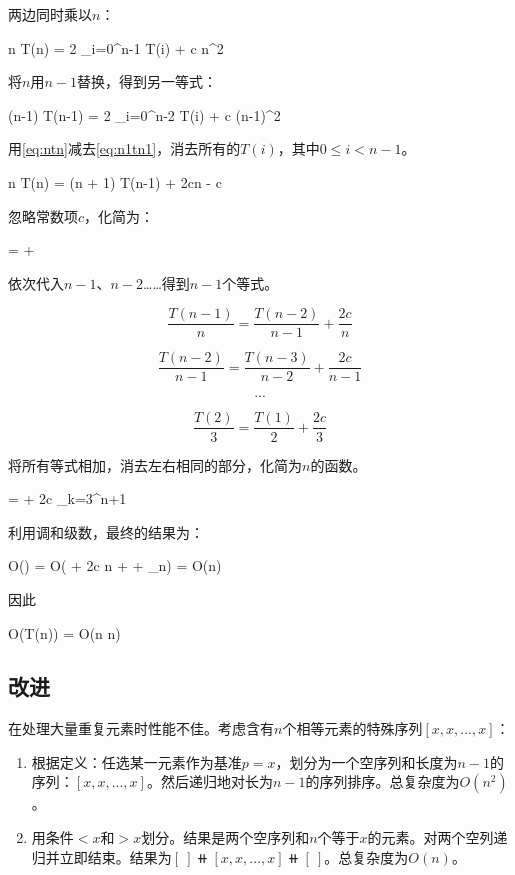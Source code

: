 \documentclass[b5paper]{ctexart}
\begin{document}
两边同时乘以$n$：

\be
n T(n) = 2 \sum_{i=0}^{n-1} T(i) + c n^2
\label{eq:ntn}
\ee

将$n$用$n-1$替换，得到另一等式：

\be
(n-1) T(n-1) = 2 \sum_{i=0}^{n-2} T(i) + c (n-1)^2
\label{eq:n1tn1}
\ee

用\cref{eq:ntn}减去\cref{eq:n1tn1}，消去所有的$T(i)$，其中$0 \leq i < n-1$。

\be
n T(n) = (n + 1) T(n-1) + 2cn - c
\ee

忽略常数项$c$，化简为：

\be
{} =  + 
\ee

依次代入$n-1$、$n-2$……得到$n-1$个等式。

\[
\frac{T(n-1)}{n} = \frac{T(n-2)}{n-1} + \frac{2c}{n}
\]

\[
\frac{T(n-2)}{n-1} = \frac{T(n-3)}{n-2} + \frac{2c}{n-1}
\]

\[
...
\]

\[
\frac{T(2)}{3} = \frac{T(1)}{2} + \frac{2c}{3}
\]

将所有等式相加，消去左右相同的部分，化简为$n$的函数。

\be
{} =  + 2c \sum_{k=3}^{n+1} 
\ee

利用调和级数，最终的结果为：

\be
O() = O( + 2c \ln n + \gamma + \epsilon_n) = O(\lg n)
\ee

因此

\be
O(T(n)) = O(n \lg n)
\ee

\subsection{改进}
 

在处理大量重复元素时性能不佳。考虑含有$n$个相等元素的特殊序列$[x, x, ..., x]$：

\begin{enumerate}
\item 根据定义：任选某一元素作为基准$p = x$，划分为一个空序列和长度为$n-1$的序列：$[x, x, ..., x]$。然后递归地对长为$n-1$的序列排序。总复杂度为$O(n^2)$。
\item 用条件$< x$和$> x$划分。结果是两个空序列和$n$个等于$x$的元素。对两个空列递归并立即结束。结果为$[\ ] \doubleplus [x, x, ..., x] \doubleplus [\ ]$。总复杂度为$O(n)$。
\end{enumerate}
\end{document}
